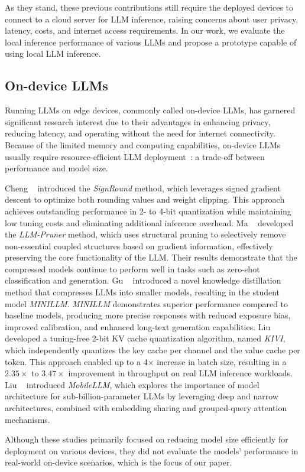 As they stand, these previous contributions still require the deployed devices to connect to a cloud server for LLM inference, raising concerns about user privacy, latency, costs, and internet access requirements. In our work, we evaluate the local inference performance of various LLMs and propose a prototype capable of using local LLM inference.

\subsection{On-device LLMs}
Running LLMs on edge devices, commonly called on-device LLMs, has garnered significant research interest due to their advantages in enhancing privacy, reducing latency, and operating without the need for internet connectivity. Because of the limited memory and computing capabilities, on-device LLMs usually require resource-efficient
LLM deployment~\cite{qu2024mobile}: a trade-off between performance and model size.

Cheng \etal~\cite{cheng2023optimize} introduced the \emph{SignRound} method, which leverages signed gradient descent to optimize both rounding values and weight clipping. This approach achieves outstanding performance in 2- to 4-bit quantization while maintaining low tuning costs and eliminating additional inference overhead. Ma \etal~\cite{ma2023llm} developed the \emph{LLM-Pruner} method, which uses structural pruning to selectively remove non-essential coupled structures based on gradient information, effectively preserving the core functionality of the LLM. Their results demonstrate that the compressed models continue to perform well in tasks such as zero-shot classification and generation. Gu \etal~\cite{gu2024minillm} introduced a novel knowledge distillation method that compresses LLMs into smaller models, resulting in the student model \emph{MINILLM}. \emph{MINILLM} demonstrates superior performance compared to baseline models, producing more precise responses with reduced exposure bias, improved calibration, and enhanced long-text generation capabilities. Liu \etal~\cite{liu2024kivi} developed a tuning-free 2-bit KV cache quantization algorithm, named \emph{KIVI}, which independently quantizes the key cache per channel and the value cache per token. This approach enabled up to a 4× increase in batch size, resulting in a $2.35\times$ to $3.47\times$ improvement in throughput on real LLM inference workloads. Liu \etal~\cite{liu2024mobilellm} introduced \emph{MobileLLM}, which explores the importance of model architecture for sub-billion-parameter LLMs by leveraging deep and narrow architectures, combined with embedding sharing and grouped-query attention mechanisms. 

Although these studies primarily focused on reducing model size efficiently for deployment on various devices, they did not evaluate the models' performance in real-world on-device scenarios, which is the focus of our paper.

